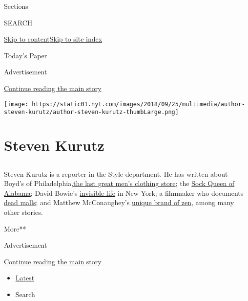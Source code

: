 Sections

SEARCH

\protect\hyperlink{site-content}{Skip to
content}\protect\hyperlink{site-index}{Skip to site index}

\href{https://myaccount.nytimes.com/auth/login?response_type=cookie\&client_id=vi}{}

\href{https://www.nytimes.com/section/todayspaper}{Today's Paper}

Advertisement

\protect\hyperlink{after-top}{Continue reading the main story}

\texttt{[image: https://static01.nyt.com/images/2018/09/25/multimedia/author-steven-kurutz/author-steven-kurutz-thumbLarge.png]}

\hypertarget{steven-kurutz}{%
\section{Steven Kurutz}\label{steven-kurutz}}

\subsection{}

Steven Kurutz is a reporter in the Style department. He has written
about Boyd's of
Philadelphia,\href{https://www.nytimes.com/2018/03/29/style/the-last-great-clothing-store-boyds.html}{the
last great men's clothing store}; the
\href{https://www.nytimes.com/2016/03/31/fashion/sock-business-alabama.html}{Sock
Queen of Alabama}; David Bowie's
\href{https://www.nytimes.com/2016/01/17/fashion/david-bowie-invisible-new-yorker.html}{invisible
life} in New York; a filmmaker who documents
\href{https://www.nytimes.com/2016/12/08/fashion/mens-style/the-tao-of-matthew-mcconaughey.html}{dead
malls}; and Matthew McConaughey's
\href{https://www.nytimes.com/2016/12/08/fashion/mens-style/the-tao-of-matthew-mcconaughey.html}{unique
brand of zen}, among many other stories.

More**

Advertisement

\protect\hyperlink{after-mid1}{Continue reading the main story}

\begin{itemize}
\tightlist
\item
  \protect\hyperlink{stream-panel}{Latest}
\item
  Search
\end{itemize}

